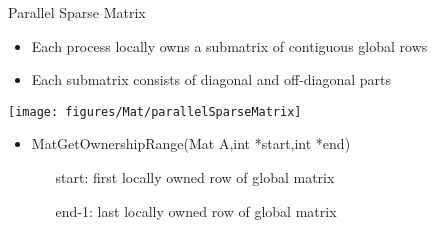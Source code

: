 \begin{frame}{Parallel Sparse Matrix}
\begin{itemize}
  \item Each process locally owns a submatrix of contiguous global rows
  \item Each submatrix consists of diagonal and off-diagonal parts
\end{itemize}

\begin{center}
\texttt{[image: figures/Mat/parallelSparseMatrix]}
\end{center}

\begin{itemize}
  \item {\kb MatGetOwnershipRange(Mat A,int *start,int *end)}
  \begin{itemize}
    \item[{\kb start}:] first locally owned row of global matrix
    \item[{\kb end-1}:] last locally owned row of global matrix
  \end{itemize}
\end{itemize}
\end{frame}



